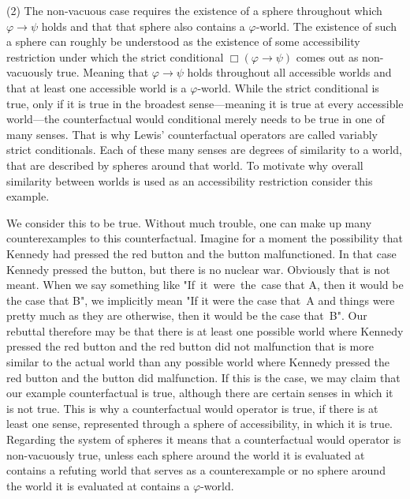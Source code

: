 \documentclass[a4paper,american,10pt]{paper}
\theoremstyle{definition}\newtheorem{lemma}[thm]{Lemma}
\theoremstyle{definition}\newtheorem{proposition}[thm]{Proposition}
\theoremstyle{definition}\newtheorem{corollary}[thm]{Corollary}
\theoremstyle{definition}\newtheorem{definition}{Definition}
\begin{document}
(2) The non-vacuous case requires the existence of a sphere throughout which $\varphi\rightarrow\psi$ holds and that that sphere also contains a $\varphi$-world. The existence of such a sphere can roughly be understood as the existence of some accessibility restriction under which the strict conditional $\Box (\varphi\rightarrow\psi)$ comes out as non-vacuously true. Meaning that $\varphi\rightarrow\psi$ holds throughout all accessible worlds and that at least one accessible world is a $\varphi$-world. While the strict conditional is true, only if it is true in the broadest sense---meaning it is true at every accessible world---the counterfactual would conditional merely needs to be true in one of many senses. That is why Lewis' counterfactual operators are called variably strict conditionals. Each of these many senses are degrees of similarity to a world, that are described by spheres around that world. To motivate why overall similarity between worlds is used as an accessibility restriction consider this example.
\begin{examplef}
\end{examplef}
We consider this to be true. Without much trouble, one can make up many counterexamples to this counterfactual. Imagine for a moment the possibility that Kennedy had pressed the red button and the button malfunctioned. In that case Kennedy pressed the button, but there is no nuclear war. Obviously that is not meant. When we say something like "If~it~were~the~case that A, then it would be the case that B", we implicitly mean "If it were the case that~A and things were pretty much as they are otherwise, then it would be the case that~B". Our rebuttal therefore may be that there is at least one possible world where Kennedy pressed the red button and the red button did not malfunction that is more similar to the actual world than any possible world where Kennedy pressed the red button and the button did malfunction. If this is the case, we may claim that our example counterfactual is true, although there are certain senses in which it is not true. This is why a counterfactual would operator is true, if there is at least one sense, represented through a sphere of accessibility, in which it is true. Regarding the system of spheres it means that a counterfactual would operator is non-vacuously true, unless each sphere around the world it is evaluated at contains a refuting world that serves as a counterexample or no sphere around the world it is evaluated at contains a $\varphi$-world.
\end{document}
